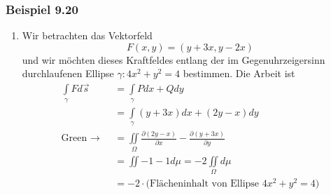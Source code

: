 \subsubsection*{Beispiel 9.20}
\begin{enumerate}
\item Wir betrachten das Vektorfeld \[ F\left( x,y\right) = \left( y+3x,y-2x\right) \]
und wir möchten dieses Kraftfeldes entlang der im Gegenuhrzeigersinn durchlaufenen Ellipse $\gamma: 4x^2+y^2=4$ bestimmen. Die Arbeit ist
\begin{align*}
\int\limits_\gamma  {Fd\vec s}  &=\int\limits_\gamma  {Pdx + Qdy} \\
 &=\int\limits_\gamma  {\left( {y + 3x} \right)dx + \left( {2y - x} \right)dy} \\
{\text{Green }} \to {\text{ }} &=\iint\limits_\Omega\frac{{\partial \left( {2y - x} \right)}}{{\partial x}} - \frac{{\partial \left( {y + 3x} \right)}}{{\partial y}}\\
&=\iint -1-1d\mu=-2\iint\limits_\Omega d\mu\\
&=-2\cdot\text{(Flächeninhalt von Ellipse $4x^2+y^2=4$)}\\
\end{align*}

\begin{center}
\end{center}


\end{enumerate}
